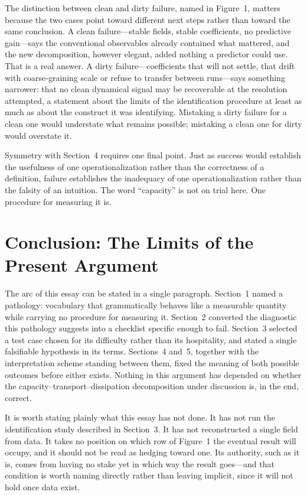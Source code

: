 \documentclass[11pt]{article}
\begin{document}
The distinction between clean and dirty failure, named in Figure~1, matters because the two cases point toward different next steps rather than toward the same conclusion. A clean failure---stable fields, stable coefficients, no predictive gain---says the conventional observables already contained what mattered, and the new decomposition, however elegant, added nothing a predictor could use. That is a real answer. A dirty failure---coefficients that will not settle, that drift with coarse-graining scale or refuse to transfer between runs---says something narrower: that no clean dynamical signal may be recoverable at the resolution attempted, a statement about the limits of the identification procedure at least as much as about the construct it was identifying. Mistaking a dirty failure for a clean one would understate what remains possible; mistaking a clean one for dirty would overstate it.

Symmetry with Section~4 requires one final point. Just as success would establish the usefulness of one operationalization rather than the correctness of a definition, failure establishes the inadequacy of one operationalization rather than the falsity of an intuition. The word ``capacity'' is not on trial here. One procedure for measuring it is.

\section{Conclusion: The Limits of the Present Argument}

The arc of this essay can be stated in a single paragraph. Section~1 named a pathology: vocabulary that grammatically behaves like a measurable quantity while carrying no procedure for measuring it. Section~2 converted the diagnostic this pathology suggests into a checklist specific enough to fail. Section~3 selected a test case chosen for its difficulty rather than its hospitality, and stated a single falsifiable hypothesis in its terms. Sections~4 and~5, together with the interpretation scheme standing between them, fixed the meaning of both possible outcomes before either exists. Nothing in this argument has depended on whether the capacity--transport--dissipation decomposition under discussion is, in the end, correct.

It is worth stating plainly what this essay has not done. It has not run the identification study described in Section~3. It has not reconstructed a single field from data. It takes no position on which row of Figure~1 the eventual result will occupy, and it should not be read as hedging toward one. Its authority, such as it is, comes from having no stake yet in which way the result goes---and that condition is worth naming directly rather than leaving implicit, since it will not hold once data exist.
\end{document}
